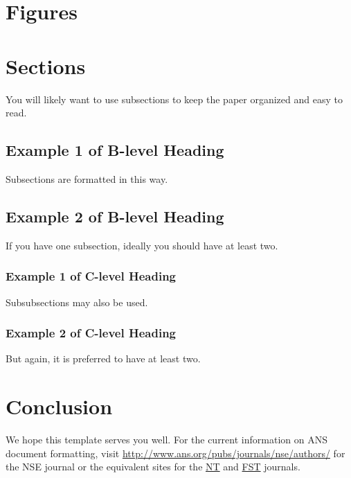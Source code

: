 \documentclass{article}                                                                           %
\begin{document}

\section{Figures}
\label{sec:figures}



\section{Sections}
\label{sec:sections}

You will likely want to use subsections to keep the paper organized and easy to read.

\subsection{Example 1 of B-level Heading}

Subsections are formatted in this way.

\subsection{Example 2 of B-level Heading}

If you have one subsection, ideally you should have at least two.

\subsubsection{Example 1 of C-level Heading}

Subsubsections may also be used.

\subsubsection{Example 2 of C-level Heading}

But again, it is preferred to have at least two.




\section{Conclusion}
\label{sec:conclusion}

We hope this template serves you well.
For the current information on ANS document formatting, visit
\url{http://www.ans.org/pubs/journals/nse/authors/} for the NSE journal
or the equivalent sites for the
\href{http://www.ans.org/pubs/journals/nt/authors/}{NT}
and \href{http://www.ans.org/pubs/journals/fst/authors/}{FST} journals.
\end{document}
